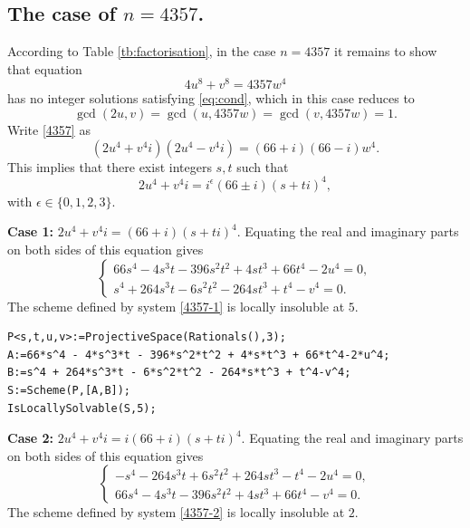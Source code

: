 \documentclass[a4paper,12pt,english,reqno]{amsart}
\begin{document}
\subsection{The case of $n=4357$.}%
According to Table \ref{tb:factorisation}, in the case $n=4357$ it remains to
show that equation 
\begin{equation}\label{4357}
4 u^8 + v^8= 4357  w^4
\end{equation}
has no integer solutions satisfying \eqref{eq:cond}, which in this case reduces to \[\gcd(2u,v)=\gcd(u,4357w)=\gcd(v,4357w)=1.\]
Write \eqref{4357} as
\begin{equation} (2u^4+v^4i)(2u^4-v^4i)=(66+i)(66-i)w^4.
\end{equation}
This implies that there exist integers $s,t$ such that 
\[2u^4+v^4i=i^{\epsilon}(66\pm i)(s+ti)^4,\]
with $\epsilon \in \{0,1,2,3\}$.



{\bf Case 1:} $2u^4+v^4i=(66+i)(s+ti)^4$. Equating the real and imaginary parts on both sides of this equation gives
\begin{equation}\label{4357-1}
\begin{cases}
66s^4 - 4s^3t - 396s^2t^2 + 4st^3 + 66t^4 - 2u^4=0,\\
s^4 + 264s^3t - 6s^2t^2 - 264st^3 + t^4 - v^4=0.
\end{cases}
\end{equation}
The scheme defined by system \eqref{4357-1} is locally insoluble at $5$.


\begin{lstlisting}
P<s,t,u,v>:=ProjectiveSpace(Rationals(),3);
A:=66*s^4 - 4*s^3*t - 396*s^2*t^2 + 4*s*t^3 + 66*t^4-2*u^4;
B:=s^4 + 264*s^3*t - 6*s^2*t^2 - 264*s*t^3 + t^4-v^4;
S:=Scheme(P,[A,B]);
IsLocallySolvable(S,5);
\end{lstlisting}


{\bf Case 2:} $2u^4+v^4i=i(66+i)(s+ti)^4$. Equating the real and imaginary parts on both sides of this equation gives
\begin{equation}\label{4357-2}
\begin{cases}
-s^4 - 264s^3t + 6s^2t^2 + 264st^3 - t^4 - 2u^4=0,\\
66s^4 - 4s^3t - 396s^2t^2 + 4st^3 + 66t^4 - v^4=0.
\end{cases}
\end{equation}
The scheme defined by system \eqref{4357-2} is locally insoluble at $2$.
\end{document}
